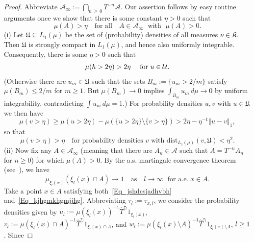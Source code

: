 \documentclass[10pt]{amsart}
\theoremstyle{definition}\newtheorem{defi}[theo]{Definition}\newtheorem{rema}[theo]{Remark}\newtheorem{exam}[theo]{Example}\newtheorem{exem}[theo]{Example}\newtheorem{nota}[theo]{Notation}
\newcommand{\clA}{\mathcal{A}}
\newcommand{\clU}{\mathcal{U}}
\newcommand{\dist}{\mathrm{dist}}
\newcommand{\frkK}{\mathfrak{K}}
\newcommand{\frkU}{\mathfrak{U}}
\begin{document}
\begin{proof}
Abbreviate $\clA_{\infty}:=\bigcap_{n\,\geq\,0}T^{-n}\clA$. Our assertion follows by easy routine arguments once we show that there is some constant $\eta>0$ such that
\begin{equation}\label{Eq_ConstEtaForTail}
\mu(A)>\eta \quad \text{for all}\quad A\in\clA_{\infty}\;\text{ with }\;
\mu(A)>0. 
\end{equation}
\vspace{6pt}
\noindent(i) Let $\frkU\subseteq L_{1}(\mu)$ be the set of (probability) densities of all measures $\nu\in\frkK$. Then $\frkU$ is strongly compact in $L_{1}(\mu)$, and hence also uniformly integrable. Consequently, there is some $\eta>0$ such that
\begin{equation}\label{Eq_scvcadsxdasxdaxdasxd}
\mu(h>2\eta)>2\eta\text{ \quad for }u\in\clU\text{.}
\end{equation}
(Otherwise there are $u_{m}\in\frkU$ such that the sets $B_{m} :=\{u_{m}>2/m\}$ satisfy $\mu(B_{m})\leq2/m$ for $m\geq1$. But $\mu (B_{m})\rightarrow0$ implies $\int_{B_{m}}u_{m}\,d\mu\rightarrow0$ by uniform integrability, contradicting $\int u_{m}\,d\mu=1$.) For probability densities $u,v$ with $u\in\frkU$ we then have
\[
\mu(v>\eta)\geq\mu(u>2\eta)-\mu\left(\{u>2\eta\}\setminus\{v>\eta\}\right)>2\eta -\eta^{-1}\left\Vert u-v\right\Vert _{1},
\]
so that
\begin{equation}\label{Eq_hvbfdhvbjdfvbjshbvbv}
\mu(v>\eta)>\eta \quad \text{for probability densities }v\text{ with }\dist_{L_{1}(\mu)}(v,\frkU)<\eta^{2}. 
\end{equation}
\vspace{6pt}
\noindent(ii) Now fix any $A\in\clA_{\infty}$ (meaning that there are $A_{n}\in\clA$ such that $A=T^{-n}A_{n}$ for $n\geq0$) for which $\mu(A)>0$. By the a.s. martingale convergence theorem (see~\cite[Theorem~35.5 and Exercise~35.17]{BilliPM}), we have
\begin{equation}\label{Eq_kjhgmkhgmjjhg}
\mu_{\xi_{l}(x)}\left(\xi_{l}(x)\cap A\right)\longrightarrow1\quad \text{as}\quad l\rightarrow\infty\;\text{ for a.e.}\;x\in A. 
\end{equation}
Take a point $x\in A$ satisfying both~\eqref{Eq_jshdcsjadhvbh} and~\eqref{Eq_kjhgmkhgmjjhg}. Abbreviating $\tau_{l}:=\tau_{x,l}$, we consider the probability densities given by $u_{l}:=\mu(\xi_{l}(x))^{-1}\widehat{T} ^{\tau_{l}}1_{\xi_{l}(x)}$, $v_{l}:=\mu(\xi_{l}(x)\cap A)^{-1}\widehat {T}^{\tau_{l}}1_{\xi_{l}(x)\cap A}$, and $w_{l}:=\mu(\xi_{l}(x)\setminus A)^{-1}\widehat{T}^{\tau_{l}}1_{\xi_{l}(x)\setminus A}$, $l\geq1$. Since

\end{proof}
\end{document}
